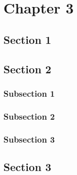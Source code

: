 \chapter{Chapter 3}%
\blindtext%
%
%
\section{Section 1}%
\blindtext%
%
%
\section{Section 2}%
\blindtext%
%
%
\subsection{Subsection 1}%
\blindtext%
%
%
\subsection{Subsection 2}%
\blindtext%
%
%
\subsection{Subsection 3}%
\blindtext%
%
%
\section{Section 3}%
\blindtext%
%
%
